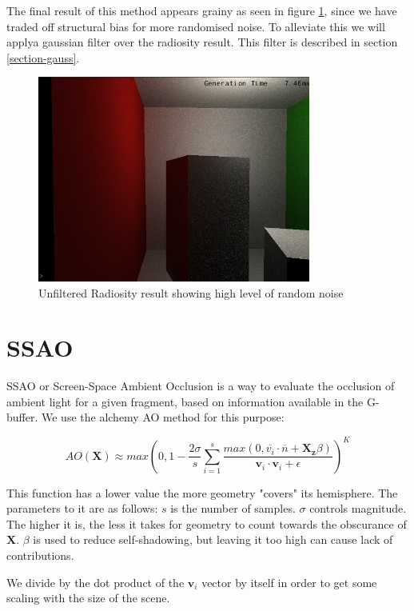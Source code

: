 The final result of this method appears grainy as seen in figure \ref{fig-noise}, since we have traded off structural bias for more randomised noise. To alleviate this we will applya gaussian filter over the radiosity result. This filter is described in section \ref{section-gauss}.

\begin{figure}[!ht]
  	\centering
  	\includegraphics[width=0.8\textwidth]{img/noise}
    \caption{Unfiltered Radiosity result showing high level of random noise}
    \label{fig-noise}
\end{figure}

\section{SSAO}
SSAO or Screen-Space Ambient Occlusion is a way to evaluate the occlusion of ambient light for a given fragment, based on information available in the G-buffer. We use the alchemy AO method for this purpose:\cite{VV11AlchemyAO}

$$AO(\mathbf{X}) \approx max \left( 0 , 1 - \frac{2 \sigma}{s} \sum_{i = 1}^{s} \frac{max(0,\overline{v_i} \cdot \overline{n} + \mathbf{X_z} \beta)}{\mathbf{v}_i \cdot \mathbf{v}_i + \epsilon} \right) ^K$$

This function has a lower value the more geometry "covers" its hemisphere. The parameters to it are as follows:
$s$ is the number of samples.
$\sigma$ controls magnitude. The higher it is, the less it takes for geometry to count towards the obscurance of $\mathbf{X}$.
$\beta$ is used to reduce self-shadowing, but leaving it too high can cause lack of contributions.

We divide by the dot product of the $\mathbf{v}_i$ vector by itself in order to get some scaling with the size of the scene.

